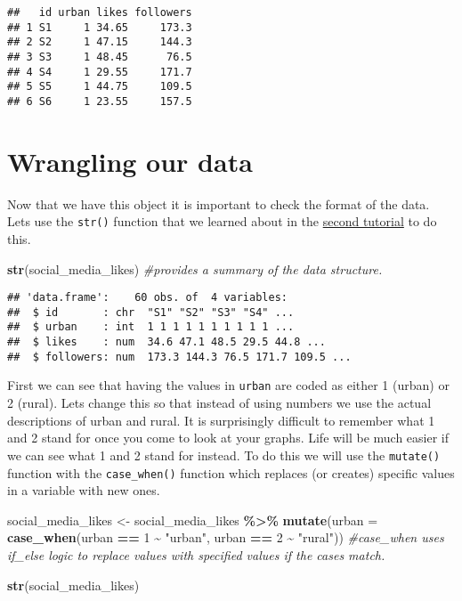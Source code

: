 \documentclass[
]{book}
\newenvironment{Shaded}{\begin{snugshade}}{\end{snugshade}}
\newcommand{\AttributeTok}[1]{\textcolor[rgb]{0.13,0.29,0.53}{#1}}
\newcommand{\CommentTok}[1]{\textcolor[rgb]{0.56,0.35,0.01}{\textit{#1}}}
\newcommand{\DecValTok}[1]{\textcolor[rgb]{0.00,0.00,0.81}{#1}}
\newcommand{\FunctionTok}[1]{\textcolor[rgb]{0.13,0.29,0.53}{\textbf{#1}}}
\newcommand{\NormalTok}[1]{#1}
\newcommand{\OtherTok}[1]{\textcolor[rgb]{0.56,0.35,0.01}{#1}}
\newcommand{\SpecialCharTok}[1]{\textcolor[rgb]{0.81,0.36,0.00}{\textbf{#1}}}
\newcommand{\StringTok}[1]{\textcolor[rgb]{0.31,0.60,0.02}{#1}}
\begin{document}
\begin{verbatim}
##   id urban likes followers
## 1 S1     1 34.65     173.3
## 2 S2     1 47.15     144.3
## 3 S3     1 48.45      76.5
## 4 S4     1 29.55     171.7
## 5 S5     1 44.75     109.5
## 6 S6     1 23.55     157.5
\end{verbatim}

\section{Wrangling our data}\label{wrangling-our-data}

Now that we have this object it is important to check the format of the data. Lets use the \texttt{str()} function that we learned about in the \hyperref[importing-your-data-in-r]{second tutorial} to do this.

\begin{Shaded}
\begin{Highlighting}[]
\FunctionTok{str}\NormalTok{(social\_media\_likes) }\CommentTok{\#provides a summary of the data structure.}
\end{Highlighting}
\end{Shaded}

\begin{verbatim}
## 'data.frame':    60 obs. of  4 variables:
##  $ id       : chr  "S1" "S2" "S3" "S4" ...
##  $ urban    : int  1 1 1 1 1 1 1 1 1 1 ...
##  $ likes    : num  34.6 47.1 48.5 29.5 44.8 ...
##  $ followers: num  173.3 144.3 76.5 171.7 109.5 ...
\end{verbatim}

First we can see that having the values in \texttt{urban} are coded as either 1 (urban) or 2 (rural). Lets change this so that instead of using numbers we use the actual descriptions of urban and rural. It is surprisingly difficult to remember what 1 and 2 stand for once you come to look at your graphs. Life will be much easier if we can see what 1 and 2 stand for instead. To do this we will use the \texttt{mutate()} function with the \texttt{case\_when()} function which replaces (or creates) specific values in a variable with new ones.

\begin{Shaded}
\begin{Highlighting}[]
\NormalTok{social\_media\_likes }\OtherTok{\textless{}{-}}\NormalTok{ social\_media\_likes }\SpecialCharTok{\%\textgreater{}\%} 
  \FunctionTok{mutate}\NormalTok{(}\AttributeTok{urban =} \FunctionTok{case\_when}\NormalTok{(urban }\SpecialCharTok{==} \DecValTok{1} \SpecialCharTok{\textasciitilde{}} \StringTok{"urban"}\NormalTok{, }
\NormalTok{                           urban }\SpecialCharTok{==} \DecValTok{2} \SpecialCharTok{\textasciitilde{}} \StringTok{"rural"}\NormalTok{)) }\CommentTok{\#case\_when uses if\_else logic to replace values with specified values if the cases match.}

\FunctionTok{str}\NormalTok{(social\_media\_likes)}
\end{Highlighting}
\end{Shaded}
\end{document}
